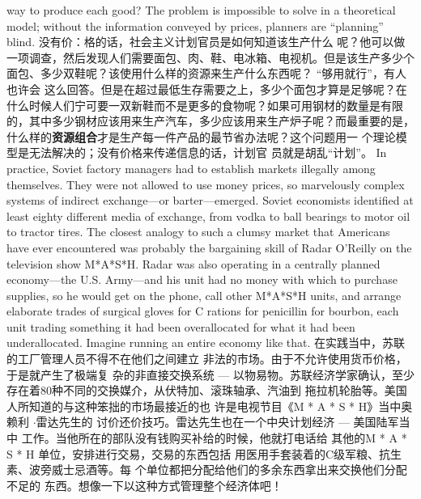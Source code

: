 \begin{paracol}{2}
way to produce each good? The problem is impossible to solve
in a theoretical model; without the information conveyed by
prices, planners are ``planning'' blind.
\switchcolumn
没有价：格的话，社会主义计划官员是如何知道该生产什么
呢？他可以做一项调查，然后发现人们需要面包、肉、鞋、电冰箱、电视机。但是该生产多少个面包、多少双鞋呢？该使用什么样的资源来生产什么东西呢？ “够用就行”，有人也许会
这么回答。但是在超过最低生存需要之上，多少个面包才算是足够呢？在什么时候人们宁可要一双新鞋而不是更多的食物呢？如果可用钢材的数量是有限的，其中多少钢材应该用来生产汽车，多少应该用来生产炉子呢？而最重要的是，什么样的\textbf{资源组合}才是生产每一件产品的最节省办法呢？这个问题用一
个理论模型是无法解决的；没有价格来传递信息的话，计划官
员就是胡乱“计划”。
\switchcolumn*
In practice, Soviet factory managers had to establish markets
illegally among themselves. They were not allowed to use money
prices, so marvelously complex systems of indirect exchange---or
barter---emerged. Soviet economists identified at least eighty different media of exchange, from vodka to ball bearings to motor
oil to tractor tires. The closest analogy to such a clumsy market
that Americans have ever encountered was probably the bargaining skill of Radar O'Reilly on the television show M*A*S*H.
Radar was also operating in a centrally planned economy---the
U.S. Army---and his unit had no money with which to purchase
supplies, so he would get on the phone, call other M*A*S*H
units, and arrange elaborate trades of surgical gloves for C rations
for penicillin for bourbon, each unit trading something it had
been overallocated for what it had been underallocated. Imagine
running an entire economy like that.
\switchcolumn
在实践当中，苏联的工厂管理人员不得不在他们之间建立
非法的市场。由于不允许使用货币价格，于是就产生了极端复
杂的非直接交换系统 --- 以物易物。苏联经济学家确认，至少
存在着80种不同的交换媒介，从伏特加、滚珠轴承、汽油到
拖拉机轮胎等。美国人所知道的与这种笨拙的市场最接近的也
许是电视节目《M * A * S * H》当中奥赖利 $\cdot$雷达先生的 讨价还价技巧。雷达先生也在一个中央计划经济 --- 美国陆军当中
工作。当他所在的部队没有钱购买补给的时候，他就打电话给
其他的M * A * S * H 单位，安排进行交易，交易的东西包括
用医用手套装着的C级军粮、抗生素、波旁威士忌酒等。每
个单位都把分配给他们的多余东西拿出来交换他们分配不足的
东西。想像一下以这种方式管理整个经济体吧！


\end{paracol}
